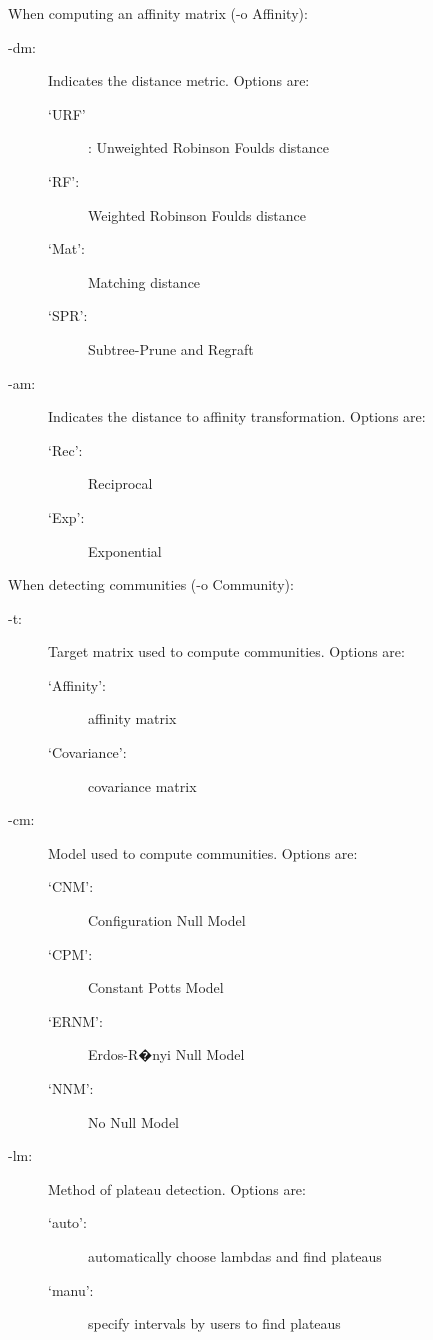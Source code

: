 \documentclass[11pt]{article}
\begin{document}
\begin{enumerate}[{\bf (1)}]
\vspace{0.5cm}

When computing an affinity matrix (-o Affinity):
	\begin{description}
	\item[-dm:] Indicates the distance metric. Options are:
		\begin{description}
		\item[`URF']: Unweighted Robinson Foulds distance
		\item[`RF':] Weighted Robinson Foulds distance
		\item[`Mat':] Matching distance
		\item[`SPR':] Subtree-Prune and Regraft
		\end{description}
	
	\item[-am:] Indicates the distance to affinity transformation. Options are:
		\begin{description}
		\item[`Rec':] Reciprocal
		\item[`Exp':] Exponential
		\end{description}
	\end{description} 

\vspace{0.5cm}

When detecting communities (-o Community):
	\begin{description}
	\item[-t:] Target matrix used to compute communities. Options are:
		\begin{description}
		\item[`Affinity':] affinity matrix
		\item[`Covariance':] covariance matrix
		\end{description}
	
	\item[-cm:] Model used to compute communities. Options are:
		\begin{description}
		\item[`CNM':] Configuration Null Model
		\item[`CPM':] Constant Potts Model
		\item[`ERNM':] Erdos-R�nyi Null Model
		\item[`NNM':] No Null Model
		\end{description}
	
	\item[-lm:] Method of plateau detection. Options are:
		\begin{description}
		\item[`auto':] automatically choose lambdas and find plateaus
		\item[`manu':] specify intervals by users to find plateaus
		\end{description}
	\end{description}


\end{enumerate}
\end{document}
